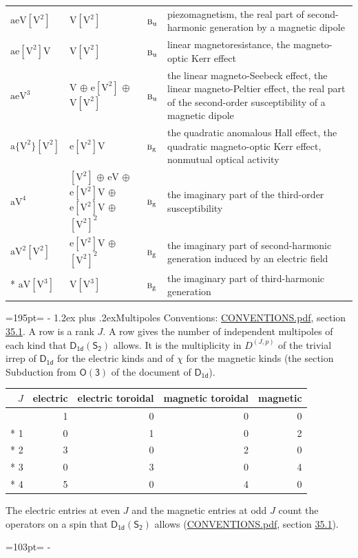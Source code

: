 \documentclass[10pt,a4paper]{article}
\makeatletter
\renewcommand\section{\@startsection{section}{1}{\z@}{-3ex plus -1ex minus -.2ex}%
  {1.2ex plus .2ex}{\normalfont\large\sffamily\bfseries\color{parttitle}}}
\newcommand{\needspace}[1]{\par\penalty-100\begingroup\dimen0=#1\relax\dimen2=\pagegoal
  \advance\dimen2-\pagetotal\ifdim\dimen0>\dimen2\relax\ifdim\dimen2>0pt\vfil\break\fi\fi
  \endgroup}
\numberwithin{equation}{section}
\newcommand{\grp}[1]{\mathsf{#1}}
\newcommand{\irr}[1]{\text{\normalfont\scshape #1}}
\newcommand{\ptag}[1]{\mathrm{#1}}
\newcommand{\irrJp}[2]{D^{(#1,#2)}}
\newcommand{\jahn}[1]{\mathrm{#1}}
\newlength{\fillwidth}\newlength{\cellwidth}\newlength{\colwidth}
\makeatother
\begin{document}
{\begin{longtable}{@{}lll>{\RaggedRight\arraybackslash}p{\fillwidth}@{}}
$\jahn{aeV[V^{2}]}$ & $\jahn{V[V^{2}]}$ & $\irr{b}_{\ptag{u}}$ & piezomagnetism, the real part of second-harmonic generation by a magnetic dipole\\
$\jahn{ae[V^{2}]V}$ & $\jahn{V[V^{2}]}$ & $\irr{b}_{\ptag{u}}$ & linear magnetoresistance, the magneto-optic Kerr effect\\
$\jahn{aeV^{3}}$ & $\jahn{V}$ $\oplus$ $\jahn{e[V^{2}]}$ $\oplus$ $\jahn{V[V^{2}]}$ & $\irr{b}_{\ptag{u}}$ & the linear magneto-Seebeck effect, the linear magneto-Peltier effect, the real part of the second-order susceptibility of a magnetic dipole\\
$\jahn{a\{V^{2}\}[V^{2}]}$ & $\jahn{e[V^{2}]V}$ & $\irr{b}_{\ptag{g}}$ & the quadratic anomalous Hall effect, the quadratic magneto-optic Kerr effect, nonmutual optical activity\\
$\jahn{aV^{4}}$ & $\jahn{[V^{2}]}$ $\oplus$ $\jahn{eV}$ $\oplus$ $\jahn{e[V^{2}]V}$ $\oplus$ $\jahn{e[V^{2}]V}$ $\oplus$ $\jahn{[V^{2}]^{2}}$ & $\irr{b}_{\ptag{g}}$ & the imaginary part of the third-order susceptibility\\
$\jahn{aV^{2}[V^{2}]}$ & $\jahn{e[V^{2}]V}$ $\oplus$ $\jahn{[V^{2}]^{2}}$ & $\irr{b}_{\ptag{g}}$ & the imaginary part of second-harmonic generation induced by an electric field\\*
$\jahn{aV[V^{3}]}$ & $\jahn{V[V^{3}]}$ & $\irr{b}_{\ptag{g}}$ & the imaginary part of third-harmonic generation\\
\bottomrule\end{longtable}}
\needspace{195pt}
\section{Multipoles}\label{s:multipoles}
Conventions: \href{../../CONVENTIONS.pdf}{CONVENTIONS.pdf}, section \href{../../CONVENTIONS.pdf\#conv.35.1}{35.1}.
A row is a rank $J$. \label{n:head.multipole.electric}\label{n:head.multipole.electric.toroidal}\label{n:head.multipole.magnetic.toroidal}\label{n:head.multipole.magnetic}A row gives the number of independent multipoles of each kind that $\grp{D_{1d}}(\grp{S_{2}})$ allows. It is the multiplicity in $\irrJp{J}{p}$ of the trivial irrep of $\grp{D_{1d}}$ for the electric kinds and of $\chi$ for the magnetic kinds (the section Subduction from $\grp{O(3)}$ of the document of \href{../../../rotation/data/pdf/D1d.pdf}{$\grp{D_{1d}}$}).
{\small\begin{longtable}{@{}rrrrr@{}}\toprule
$J$ & electric & electric toroidal & magnetic toroidal & magnetic\\\midrule\endhead
\bottomrule\endfoot\endlastfoot
0 & 1 & 0 & 0 & 0\\*
1 & 0 & 1 & 0 & 2\\*
2 & 3 & 0 & 2 & 0\\*
3 & 0 & 3 & 0 & 4\\*
4 & 5 & 0 & 4 & 0\\
\bottomrule\end{longtable}}
The electric entries at even $J$ and the magnetic entries at odd $J$ count the operators on a spin that $\grp{D_{1d}}(\grp{S_{2}})$ allows (\href{../../CONVENTIONS.pdf}{CONVENTIONS.pdf}, section \href{../../CONVENTIONS.pdf\#conv.35.1}{35.1}).
\needspace{103pt}
\end{document}
